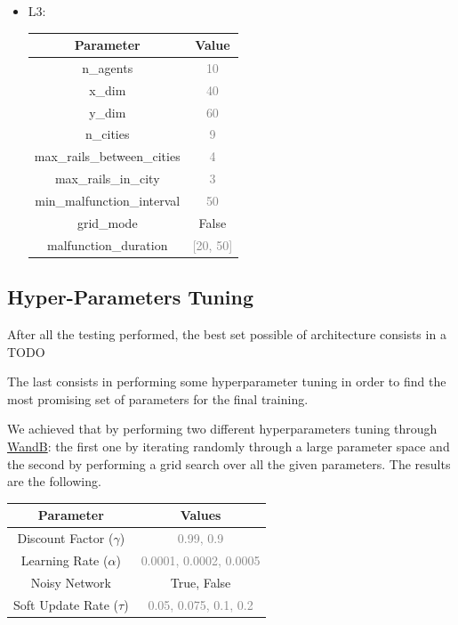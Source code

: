 \documentclass[12pt]{article}
\begin{document}
\begin{itemize}
    \item L3: 
\begin{center}
\begin{tabular}{ |c|c| } 
    \hline
\textbf{Parameter} & \textbf{Value} \\ 
    \hline
\textcolor{BrickRed}{n\_agents} & \textcolor{gray}{10} \\ 
    \hline
\textcolor{BrickRed}{x\_dim} & \textcolor{gray}{40}\\ 
    \hline
\textcolor{BrickRed}{y\_dim} & \textcolor{gray}{60}\\ 
    \hline
\textcolor{BrickRed}{n\_cities} & \textcolor{gray}{9}\\ 
    \hline
\textcolor{BrickRed}{ max\_rails\_between\_cities} & \textcolor{gray}{4}\\ 
    \hline
\textcolor{BrickRed}{max\_rails\_in\_city} & \textcolor{gray}{3}\\ 
    \hline
\textcolor{BrickRed}{min\_malfunction\_interval} & \textcolor{gray}{50}\\ 
    \hline
\textcolor{BrickRed}{grid\_mode} & \textcolor{OliveGreen}{False}\\ 
    \hline
\textcolor{BrickRed}{malfunction\_duration} & \textcolor{gray}{[20, 50]}\\ 
\hline
\end{tabular}
\end{center}


\end{itemize}


\subsection{Hyper-Parameters Tuning}

After all the testing performed, the best set possible of architecture consists in a TODO

The last consists in performing some hyperparameter tuning in order to find the most promising set of parameters for the final training.

We achieved that by performing two different hyperparameters tuning through \hyperlink{https://wandb.ai/}{WandB}: the first one by iterating randomly through a large parameter space and the second by performing a grid search over all the given parameters. The results are the following. 

\begin{center}
\begin{tabular}{ |c|c| } 
    \hline
\textbf{Parameter} & \textbf{Values} \\ 
    \hline
\textcolor{BrickRed}{Discount Factor ($\gamma$)} & \textcolor{gray}{0.99, 0.9} \\ 
    \hline
\textcolor{BrickRed}{Learning Rate ($\alpha$)} & \textcolor{gray}{0.0001, 0.0002, 0.0005}\\ 
    \hline
\textcolor{BrickRed}{Noisy Network} & \textcolor{OliveGreen}{True, False}\\ 
    \hline
\textcolor{BrickRed}{Soft Update Rate ($\tau$)} & \textcolor{gray}{0.05, 0.075, 0.1, 0.2}\\ 
    \hline
\end{tabular}
\end{center}
\end{document}
